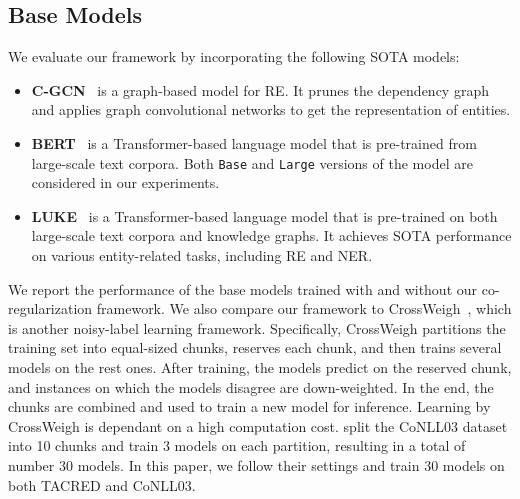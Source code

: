 \documentclass[11pt]{article}
\begin{document}
\subsection{Base Models}\label{sup:comp}
We evaluate our framework by incorporating the following SOTA models:
\begin{itemize}[leftmargin=1em]
    \setlength\itemsep{0em}
    \item \textbf{C-GCN}~\cite{Zhang2018GraphCO} is a graph-based model for RE.
    It prunes the dependency graph and applies graph convolutional networks to get the representation of entities.
    \item \textbf{BERT}~\cite{Devlin2019BERTPO} is a Transformer-based language model that is pre-trained from large-scale text corpora.
    Both \texttt{Base} and \texttt{Large} versions of the model are considered in our experiments.
    \item \textbf{LUKE}~\cite{Yamada2020LUKEDC} is a Transformer-based language model that is pre-trained on both large-scale text corpora and knowledge graphs.
    It achieves SOTA performance on various entity-related tasks, including RE and NER.
\end{itemize}
We report the performance of the base models trained with and without our co-regularization framework.
We also compare our framework to CrossWeigh~\cite{Wang2019CrossWeighTN}, which is another noisy-label learning framework.
Specifically, CrossWeigh partitions the training set into equal-sized chunks, reserves each chunk, and then trains several models on the rest ones.
After training, the models predict on the reserved chunk, and instances on which the models disagree are down-weighted.
In the end, the chunks are combined and used to train a new model for inference.
Learning by CrossWeigh is dependant on a high computation cost.
\citet{Wang2019CrossWeighTN} split the CoNLL03 dataset into 10 chunks and train 3 models on each partition, resulting in a total of number 30 models.
In this paper, we follow their settings and train 30 models on both TACRED and CoNLL03.


\begin{table}[t]
    \centering
    \caption{Data statistics of TACRED and CoNLL03.}
    \label{tab:data_statistics}
\end{table}
\end{document}
